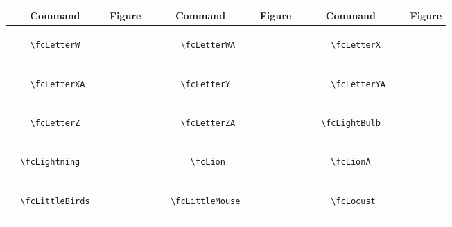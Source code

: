 \documentclass[x11names]{article}
\begin{document}
\begin{table}[H]\centering\begin{tabular}{|c|c|c|c|c|c|}\hline{\bf Command} & {\bf Figure} & {\bf Command} & {\bf Figure} & {\bf Command} & {\bf Figure}\\	\hline	&\multirow{5}{*}{	\fcLetterW	[scale=0.16]} & &\multirow{5}{*}{	\fcLetterWA	[scale=0.16]} & &\multirow{5}{*}{	\fcLetterX	[scale=0.16]}\\	& & & & & \\	& & & & & \\	\verb|	\fcLetterW	| & & \verb|	\fcLetterWA	| & & \verb|	\fcLetterX	| & \\	& & & & & \\	& & & & & \\	& & & & & \\	\hline									
		&\multirow{5}{*}{	\fcLetterXA	[scale=0.16]} & &\multirow{5}{*}{	\fcLetterY	[scale=0.16]} & &\multirow{5}{*}{	\fcLetterYA	[scale=0.16]}\\	& & & & & \\	& & & & & \\	\verb|	\fcLetterXA	| & & \verb|	\fcLetterY	| & & \verb|	\fcLetterYA	| & \\	& & & & & \\	& & & & & \\	& & & & & \\	\hline									
		&\multirow{5}{*}{	\fcLetterZ	[scale=0.16]} & &\multirow{5}{*}{	\fcLetterZA	[scale=0.16]} & &\multirow{5}{*}{	\fcLightBulb	[scale=0.16]}\\	& & & & & \\	& & & & & \\	\verb|	\fcLetterZ	| & & \verb|	\fcLetterZA	| & & \verb|	\fcLightBulb	| & \\	& & & & & \\	& & & & & \\	& & & & & \\	\hline									
		&\multirow{5}{*}{	\fcLightning	[scale=0.16]} & &\multirow{5}{*}{	\fcLion	[scale=0.64]} & &\multirow{5}{*}{	\fcLionA	[scale=0.16]}\\	& & & & & \\	& & & & & \\	\verb|	\fcLightning	| & & \verb|	\fcLion	| & & \verb|	\fcLionA	| & \\	& & & & & \\	& & & & & \\	& & & & & \\	\hline									
		&\multirow{5}{*}{	\fcLittleBirds	[scale=0.16]} & &\multirow{5}{*}{	\fcLittleMouse	[scale=0.16]} & &\multirow{5}{*}{	\fcLocust	[scale=0.16]}\\	& & & & & \\	& & & & & \\	\verb|	\fcLittleBirds	| & & \verb|	\fcLittleMouse	| & & \verb|	\fcLocust	| & \\	& & & & & \\	& & & & & \\	& & & & & \\	\hline									

\end{tabular}
\end{table}
\end{document}
